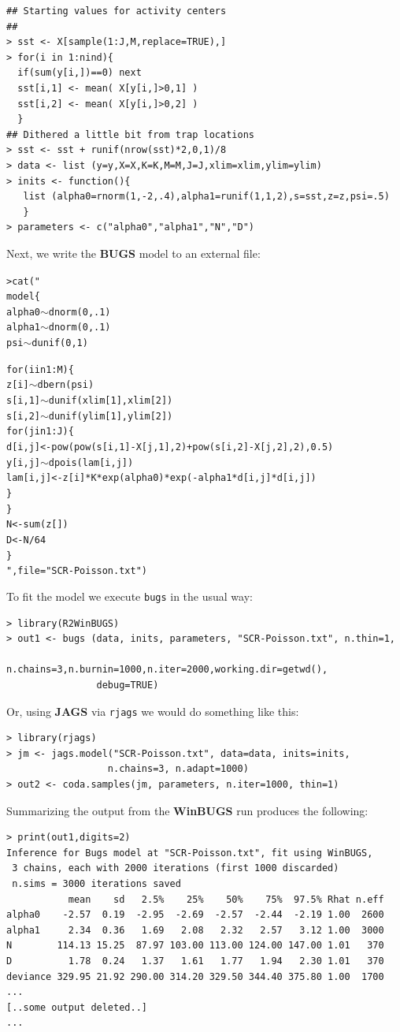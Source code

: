 {\small
\begin{verbatim}
## Starting values for activity centers
##
> sst <- X[sample(1:J,M,replace=TRUE),] 
> for(i in 1:nind){
  if(sum(y[i,])==0) next
  sst[i,1] <- mean( X[y[i,]>0,1] )
  sst[i,2] <- mean( X[y[i,]>0,2] )
  }
## Dithered a little bit from trap locations
> sst <- sst + runif(nrow(sst)*2,0,1)/8
> data <- list (y=y,X=X,K=K,M=M,J=J,xlim=xlim,ylim=ylim)
> inits <- function(){
   list (alpha0=rnorm(1,-2,.4),alpha1=runif(1,1,2),s=sst,z=z,psi=.5)
   }
> parameters <- c("alpha0","alpha1","N","D")
\end{verbatim}
}
Next, we write the {\bf BUGS} model to an external file:
{\small
\begin{alltt}
> cat("
model \{
 alpha0 \(\sim\) dnorm(0,.1)
 alpha1 \(\sim\) dnorm(0,.1)
 psi \(\sim\) dunif(0,1)

 for(i in 1:M)\{
   z[i] \(\sim\) dbern(psi)
   s[i,1] \(\sim\) dunif(xlim[1],xlim[2])
   s[i,2] \(\sim\) dunif(ylim[1],ylim[2])
   for(j in 1:J)\{
      d[i,j] <- pow(pow(s[i,1]-X[j,1],2) + pow(s[i,2]-X[j,2],2),0.5)
      y[i,j] \(\sim\) dpois(lam[i,j])
      lam[i,j] <- z[i]*K*exp(alpha0)*exp(- alpha1*d[i,j]*d[i,j])
   \}
  \}
 N <- sum(z[])
 D <- N/64
\}
",file = "SCR-Poisson.txt")
\end{alltt}
}
To fit the model we execute \mbox{\tt bugs} in the usual way:
{\small
\begin{verbatim}
> library(R2WinBUGS)
> out1 <- bugs (data, inits, parameters, "SCR-Poisson.txt", n.thin=1,
                n.chains=3,n.burnin=1000,n.iter=2000,working.dir=getwd(),
                debug=TRUE)
\end{verbatim}
}
{\flushleft Or, using {\bf JAGS} via \mbox{\tt rjags} we would do
  something like this:}
{\small
\begin{verbatim}
> library(rjags)
> jm <- jags.model("SCR-Poisson.txt", data=data, inits=inits,
                  n.chains=3, n.adapt=1000)
> out2 <- coda.samples(jm, parameters, n.iter=1000, thin=1)
\end{verbatim}
}
{\flushleft
Summarizing } the output from the {\bf WinBUGS}  run produces the following:
{\small
\begin{verbatim}
> print(out1,digits=2)
Inference for Bugs model at "SCR-Poisson.txt", fit using WinBUGS,
 3 chains, each with 2000 iterations (first 1000 discarded)
 n.sims = 3000 iterations saved
           mean    sd   2.5%    25%    50%    75%  97.5% Rhat n.eff
alpha0    -2.57  0.19  -2.95  -2.69  -2.57  -2.44  -2.19 1.00  2600
alpha1     2.34  0.36   1.69   2.08   2.32   2.57   3.12 1.00  3000
N        114.13 15.25  87.97 103.00 113.00 124.00 147.00 1.01   370
D          1.78  0.24   1.37   1.61   1.77   1.94   2.30 1.01   370
deviance 329.95 21.92 290.00 314.20 329.50 344.40 375.80 1.00  1700
...
[..some output deleted..]
...
\end{verbatim}
}

